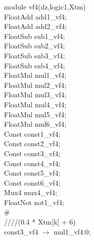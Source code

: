 module vf4(dz,logic1,Xtm){ \\
\hspace*{2em}FloatAdd add1\_vf4; \\
\hspace*{2em}FloatAdd add2\_vf4; \\
\hspace*{2em}FloatSub sub1\_vf4; \\
\hspace*{2em}FloatSub sub2\_vf4; \\
\hspace*{2em}FloatSub sub3\_vf4; \\
\hspace*{2em}FloatSub sub4\_vf4; \\
\hspace*{2em}FloatMul mul1\_vf4; \\
\hspace*{2em}FloatMul mul2\_vf4; \\
\hspace*{2em}FloatMul mul3\_vf4; \\
\hspace*{2em}FloatMul mul4\_vf4; \\
\hspace*{2em}FloatMul mul5\_vf4; \\
\hspace*{2em}FloatMul mul6\_vf4; \\
\hspace*{2em}Const const1\_vf4; \\
\hspace*{2em}Const const2\_vf4; \\
\hspace*{2em}Const const3\_vf4; \\
\hspace*{2em}Const const4\_vf4; \\
\hspace*{2em}Const const5\_vf4; \\
\hspace*{2em}Const const6\_vf4; \\
\hspace*{2em}Mux4 mux4\_vf4; \\
\hspace*{2em}FloatNot not1\_vf4; \\
\# \\
\hspace*{2em}////(0.4 * Xtm[k] + 6) \\
\hspace*{2em}const3\_vf4 $\rightarrow$ mul1\_vf4:0; \\
}
